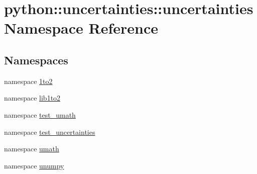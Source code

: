 \hypertarget{namespacepython_1_1uncertainties_1_1uncertainties}{
\section{python::uncertainties::uncertainties Namespace Reference}
\label{namespacepython_1_1uncertainties_1_1uncertainties}
}
\subsection*{Namespaces}
\begin{DoxyCompactItemize}
\item 
namespace \hyperlink{namespacepython_1_1uncertainties_1_1uncertainties_1_11to2}{1to2}
\item 
namespace \hyperlink{namespacepython_1_1uncertainties_1_1uncertainties_1_1lib1to2}{lib1to2}
\item 
namespace \hyperlink{namespacepython_1_1uncertainties_1_1uncertainties_1_1test__umath}{test\_\-umath}
\item 
namespace \hyperlink{namespacepython_1_1uncertainties_1_1uncertainties_1_1test__uncertainties}{test\_\-uncertainties}
\item 
namespace \hyperlink{namespacepython_1_1uncertainties_1_1uncertainties_1_1umath}{umath}
\item 
namespace \hyperlink{namespacepython_1_1uncertainties_1_1uncertainties_1_1unumpy}{unumpy}
\end{DoxyCompactItemize}
